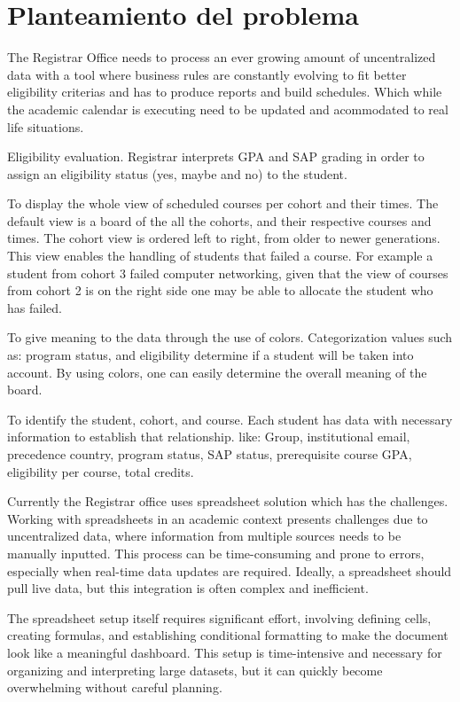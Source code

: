 \section{Planteamiento del problema}

The Registrar Office needs to process an ever growing amount of uncentralized data with a tool where business rules are constantly evolving to fit better eligibility criterias and has to produce reports and build schedules. Which while the academic calendar is executing need to be updated and acommodated to real life situations.

Eligibility evaluation. Registrar interprets GPA and SAP grading in order to assign an eligibility status (yes, maybe and no) to the student.

To display the whole view of scheduled courses per cohort and their times. The default view is a board of the all the cohorts, and their respective courses and times.
 The cohort view is ordered left to right, from older to newer generations. This view enables the handling of students that failed a course. For example a student  from cohort 3 failed computer networking, given that the view of courses from cohort 2 is on the right side one may be able to allocate the student who has failed.

To give meaning to the data through the use of colors. Categorization values such as: program status, and eligibility determine if a student will be taken into account. By using colors, one can easily determine the overall meaning of the board.

To identify the student, cohort, and course. Each student has data with necessary information to establish that relationship. like: Group, institutional email, precedence country, program status, SAP status, prerequisite course GPA, eligibility per course, total credits.

Currently the Registrar office uses spreadsheet solution which has the challenges.
Working with spreadsheets in an academic context presents challenges due to uncentralized data, where information from multiple sources needs to be manually inputted. This process can be time-consuming and prone to errors, especially when real-time data updates are required. Ideally, a spreadsheet should pull live data, but this integration is often complex and inefficient.

The spreadsheet setup itself requires significant effort, involving defining cells, creating formulas, and establishing conditional formatting to make the document look like a meaningful dashboard. This setup is time-intensive and necessary for organizing and interpreting large datasets, but it can quickly become overwhelming without careful planning.

